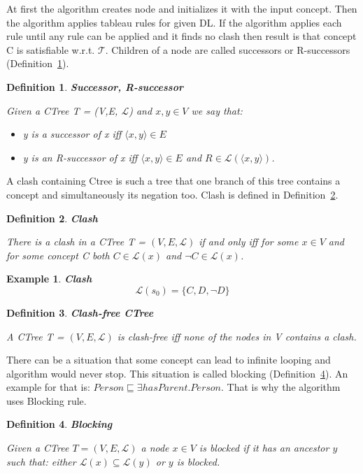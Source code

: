 \documentclass[12pt,a4paper]{article}
\newtheorem{definition}{Definition}[subsection]
\newtheorem{example}{Example}[subsection]
\begin{document}
At first the algorithm creates node and initializes it with the input concept.
Then the algorithm applies tableau rules for given DL. If the algorithm applies each rule until any rule can be applied and it finds no clash then result is that concept C is satisfiable w.r.t. $\mathcal{T}$. Children of a node are called successors or R-successors (Definition~\ref{def:successor}).

\begin{definition}{\textbf{Successor, R-successor}}
	\label{def:successor}

	Given a CTree T = (V,E, $\mathcal{L}$) and $x,y \in V$ we say that: 
	\begin{itemize}
		\item y is a successor of x iff $\langle x,y \rangle \in E$
		\item y is an R-successor of x iff $\langle x,y \rangle \in E$ and $R \in \mathcal{L}(\langle x,y \rangle)$.
	\end{itemize}
\end{definition}

A clash containing Ctree is such a tree that one branch of this tree contains a concept and simultaneously its negation too. Clash is defined in Definition~\ref{def:clash}.

\begin{definition}{\textbf{Clash}}
	\label{def:clash}

	There is a clash in a CTree T = $(V,E, \mathcal{L})$ if and only iff for some $x \in V$ and for some concept C both $C \in \mathcal{L}(x)$ and $\neg C \in \mathcal{L}(x)$.
\end{definition}

\begin{example}{\textbf{Clash}}
	\[ \mathcal{L}(s_{0}) = \{ C, D, \neg D \} \]
\end{example}

\begin{definition}{\textbf{Clash-free CTree}}

A CTree T = $(V,E, \mathcal{L})$ is clash-free iff none of the nodes in V contains a clash.
\end{definition}

There can be a situation that some concept can lead to infinite looping and algorithm would never stop. This situation is called blocking (Definition~\ref{def:blocking}). An example for that is: $Person \sqsubseteq \exists hasParent.Person$. That is why the algorithm uses Blocking rule.

\begin{definition}{\textbf{Blocking}}
	\label{def:blocking}
	
	Given a CTree $T = (V, E, \mathcal{L})$ a node $x \in V$ is blocked if it has an ancestor $y$ such that: either $\mathcal{L}(x) \subseteq \mathcal{L}(y)$ or $y$ is blocked.
\end{definition}
\end{document}

